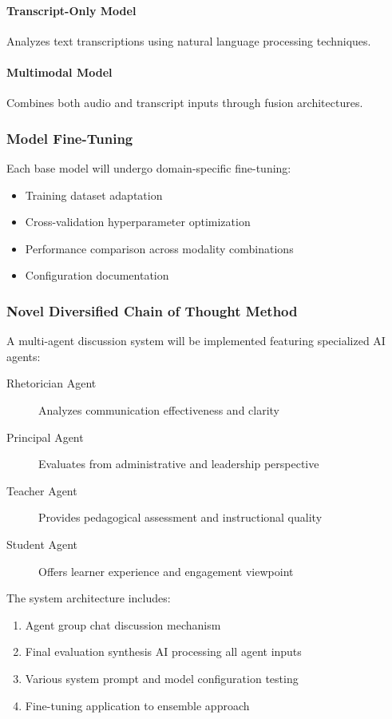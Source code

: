 \documentclass[12pt]{article}
\begin{document}
\paragraph{Transcript-Only Model} Analyzes text transcriptions using natural language processing techniques.

\paragraph{Multimodal Model} Combines both audio and transcript inputs through fusion architectures.

\subsubsection{Model Fine-Tuning}
Each base model will undergo domain-specific fine-tuning:
\begin{itemize}
    \item Training dataset adaptation
    \item Cross-validation hyperparameter optimization
    \item Performance comparison across modality combinations
    \item Configuration documentation
\end{itemize}

\subsubsection{Novel Diversified Chain of Thought Method}
A multi-agent discussion system will be implemented featuring specialized AI agents:

\begin{description}
    \item[Rhetorician Agent] Analyzes communication effectiveness and clarity
    \item[Principal Agent] Evaluates from administrative and leadership perspective
    \item[Teacher Agent] Provides pedagogical assessment and instructional quality
    \item[Student Agent] Offers learner experience and engagement viewpoint
\end{description}

The system architecture includes:
\begin{enumerate}
    \item Agent group chat discussion mechanism
    \item Final evaluation synthesis AI processing all agent inputs
    \item Various system prompt and model configuration testing
    \item Fine-tuning application to ensemble approach
\end{enumerate}
\end{document}
